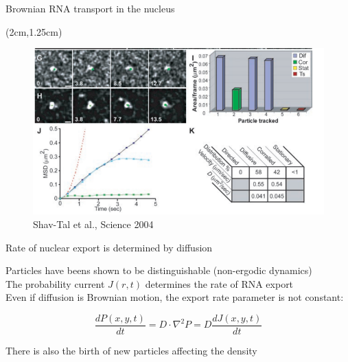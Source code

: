 \documentclass[aspectratio=1610]{beamer}					%
\begin{document}
\begin{frame}{Brownian RNA transport in the nucleus}

\begin{textblock*}{12cm}(2cm,1.25cm)
\begin{figure}
\includegraphics[width=12cm]{diffusion.png}
\caption{Shav-Tal et al., Science 2004}
\end{figure}
\end{textblock*}

\end{frame}

\begin{frame}{Rate of nuclear export is determined by diffusion}

Particles have beens shown to be distinguishable (non-ergodic dynamics) \\
\vspace{0.1in}
The probability current $J(r,t)$ determines the rate of RNA export\\
\vspace{0.1in}
Even if diffusion is Brownian motion, the export rate parameter is not constant:

\begin{equation*}
\frac{dP(x,y,t)}{dt} = D\cdot\nabla^{2}P = D\frac{dJ(x,y,t)}{dt}
\end{equation*}

There is also the birth of new particles affecting the density\\
\vspace{0.1in}

\end{frame}
\end{document}

